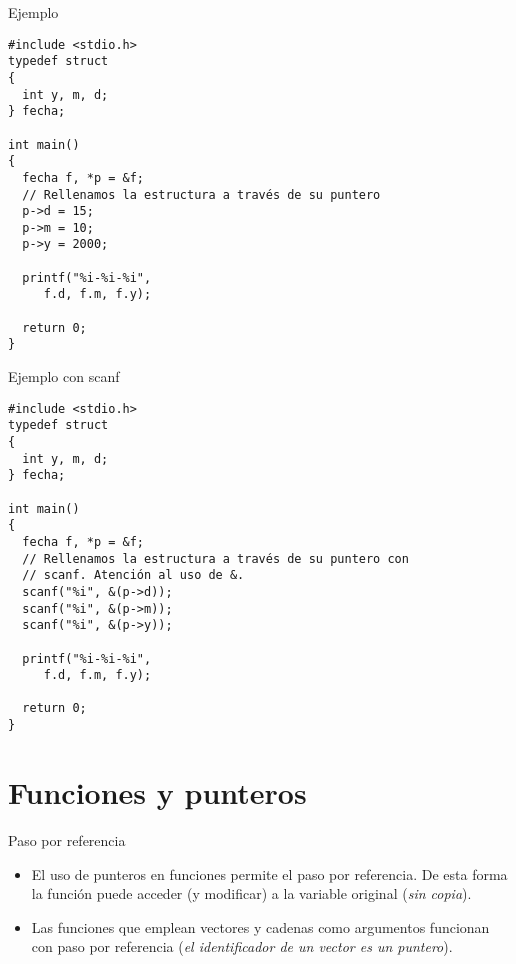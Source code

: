 \documentclass[xcolor={usenames,svgnames,dvipsnames}, aspectratio=169]{beamer}
\begin{document}
\begin{frame}[label={sec:org6ce3372},fragile,plain]{Ejemplo}
 \lstset{language=C,label= ,caption= ,captionpos=b,numbers=none}
\begin{lstlisting}
#include <stdio.h>
typedef struct 
{
  int y, m, d;
} fecha;

int main()
{
  fecha f, *p = &f;
  // Rellenamos la estructura a través de su puntero
  p->d = 15;
  p->m = 10;
  p->y = 2000;

  printf("%i-%i-%i",
	 f.d, f.m, f.y);

  return 0;
}
\end{lstlisting}
\end{frame}

\begin{frame}[label={sec:orgca950ae},fragile,plain]{Ejemplo con scanf}
 \lstset{language=C,label= ,caption= ,captionpos=b,numbers=none}
\begin{lstlisting}
#include <stdio.h>
typedef struct 
{
  int y, m, d;
} fecha;

int main()
{
  fecha f, *p = &f;
  // Rellenamos la estructura a través de su puntero con
  // scanf. Atención al uso de &.
  scanf("%i", &(p->d));
  scanf("%i", &(p->m));
  scanf("%i", &(p->y));

  printf("%i-%i-%i",
	 f.d, f.m, f.y);

  return 0;
}
\end{lstlisting}
\end{frame}


\section{Funciones y punteros}
\label{sec:orgc017a4d}
\begin{frame}[label={sec:orgb07a3f6}]{Paso por referencia}
\begin{itemize}
\item El uso de punteros en funciones permite el \alert{paso por referencia}. De esta forma la función puede acceder (y \alert{modificar}) a la variable original (\emph{sin copia}).

\item Las funciones que emplean \alert{vectores y cadenas} como argumentos funcionan con \alert{paso por referencia} (\emph{el identificador de un vector es un puntero}).
\end{itemize}
\end{frame}
\end{document}
